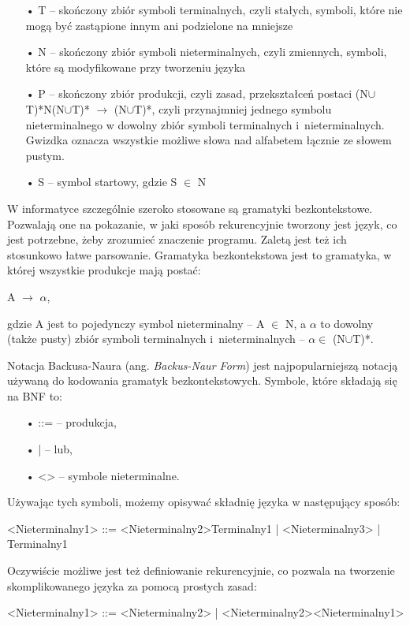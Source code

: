 \begin{itemize}
  \item[•] T -- skończony zbiór symboli terminalnych, czyli stałych, symboli, które nie mogą być zastąpione innym ani podzielone na mniejsze 
  \item[•] N -- skończony zbiór symboli nieterminalnych, czyli zmiennych, symboli, które są modyfikowane przy tworzeniu języka
  \item[•] P -- skończony zbiór produkcji, czyli zasad, przekształceń postaci (N$\cup$T)*N(N$\cup$T)* $\rightarrow$ (N$\cup$T)*, czyli przynajmniej jednego symbolu nieterminalnego w dowolny zbiór symboli terminalnych i~nieterminalnych. Gwizdka oznacza wszystkie możliwe słowa nad alfabetem łącznie ze słowem pustym.
  \item[•] S -- symbol startowy, gdzie S $\in$ N
\end{itemize}

W informatyce szczególnie szeroko stosowane są gramatyki bezkontekstowe. Pozwalają one na pokazanie, w jaki sposób rekurencyjnie tworzony jest język, co jest potrzebne, żeby zrozumieć znaczenie programu. Zaletą jest też ich stosunkowo łatwe parsowanie.
Gramatyka bezkontekstowa jest to gramatyka, w której wszystkie produkcje mają postać:
\begin{center}
	A $\rightarrow$ {$\alpha$},
\end{center}
gdzie A jest to pojedynczy symbol nieterminalny -- A $\in$ N, a $\alpha$ to dowolny (także pusty) zbiór symboli terminalnych i~nieterminalnych -- $\alpha \in$ (N$\cup$T)*.
	
Notacja Backusa-Naura (ang. \textit{Backus-Naur Form}) \cite{Backus1959TheSA, Naur, Knuth1964} jest najpopularniejszą notacją używaną do kodowania gramatyk bezkontekstowych. Symbole, które składają się na BNF to:

\begin{itemize}
  \item[•] ::= -- produkcja,
  \item[•] |   -- lub,
  \item[•] <>  -- symbole nieterminalne.
\end{itemize}

Używając tych symboli, możemy opisywać składnię języka w następujący sposób:
\begin{center}
<Nieterminalny1> ::= <Nieterminalny2>Terminalny1 | <Nieterminalny3> | Terminalny1
\end{center}
Oczywiście możliwe jest też definiowanie rekurencyjnie, co pozwala na tworzenie skomplikowanego języka za pomocą prostych zasad: 
\begin{center}
<Nieterminalny1> ::= <Nieterminalny2> | <Nieterminalny2><Nieterminalny1>
\end{center}

